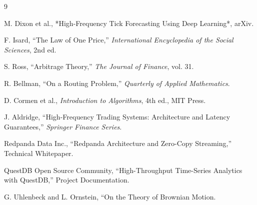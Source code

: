 \documentclass[letterpaper,11pt]{report}
\begin{document}
\begin{thebibliography}{9}


M. Dixon et al., *High-Frequency Tick Forecasting Using Deep Learning*, arXiv.

F. Isard, ``The Law of One Price,'' \emph{International Encyclopedia of the Social Sciences}, 2nd ed.

S. Ross, ``Arbitrage Theory,'' \emph{The Journal of Finance}, vol. 31.

R. Bellman, ``On a Routing Problem,'' \emph{Quarterly of Applied Mathematics}.


D. Cormen et al., \emph{Introduction to Algorithms}, 4th ed., MIT Press.

J. Aldridge, ``High-Frequency Trading Systems: Architecture and Latency Guarantees,'' \emph{Springer Finance Series}.

Redpanda Data Inc., ``Redpanda Architecture and Zero-Copy Streaming,'' Technical Whitepaper.

QuestDB Open Source Community, ``High-Throughput Time-Series Analytics with QuestDB,'' Project Documentation.

G. Uhlenbeck and L. Ornstein, ``On the Theory of Brownian Motion.

\end{thebibliography}


\newpage
\mbox{}



\end{document}
